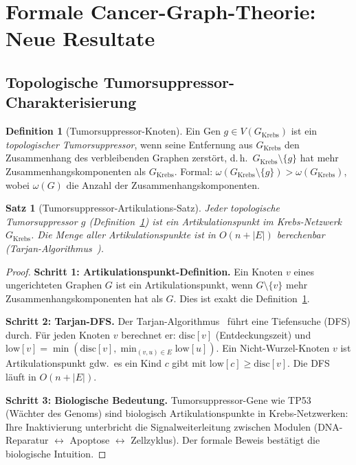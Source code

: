 ﻿\documentclass[a4paper,12pt]{article}
\theoremstyle{plain}
\newtheorem{satz}{Satz}
\theoremstyle{definition}
\newtheorem{definition}{Definition}
\theoremstyle{remark}
\newcommand{\Gkrebs}{G_{\mathrm{Krebs}}}
\begin{document}
\section{Formale Cancer-Graph-Theorie: Neue Resultate}

\subsection{Topologische Tumorsuppressor-Charakterisierung}

\begin{definition}[Tumorsuppressor-Knoten]
\label{def:tumor_supp}
Ein Gen $g \in V(\Gkrebs)$ ist ein \emph{topologischer Tumorsuppressor},
wenn seine Entfernung aus $\Gkrebs$ den Zusammenhang des
verbleibenden Graphen zerst\"ort, d.\,h.\
$\Gkrebs \setminus \{g\}$ hat mehr Zusammenhangskomponenten als $\Gkrebs$.
Formal: $\omega(\Gkrebs \setminus \{g\}) > \omega(\Gkrebs)$,
wobei $\omega(G)$ die Anzahl der Zusammenhangskomponenten.
\end{definition}

\begin{satz}[Tumorsuppressor-Artikulations-Satz]
\label{satz:tumor_artik}
Jeder topologische Tumorsuppressor $g$ (Definition~\ref{def:tumor_supp})
ist ein \emph{Artikulationspunkt} im Krebs-Netzwerk $\Gkrebs$.
Die Menge aller Artikulationspunkte ist in $O(n + |E|)$ berechenbar
(Tarjan-Algorithmus~\cite{tarjan1972}).
\end{satz}

\begin{proof}
\textbf{Schritt 1: Artikulationspunkt-Definition.}
Ein Knoten $v$ eines ungerichteten Graphen $G$ ist ein Artikulationspunkt,
wenn $G \setminus \{v\}$ mehr Zusammenhangskomponenten hat als $G$.
Dies ist exakt die Definition~\ref{def:tumor_supp}.

\textbf{Schritt 2: Tarjan-DFS.}
Der Tarjan-Algorithmus~\cite{tarjan1972} f\"uhrt eine Tiefensuche (DFS) durch.
F\"ur jeden Knoten $v$ berechnet er:
$\mathrm{disc}[v]$ (Entdeckungszeit) und
$\mathrm{low}[v] = \min(\mathrm{disc}[v], \min_{(v,u)\in E}\mathrm{low}[u])$.
Ein Nicht-Wurzel-Knoten $v$ ist Artikulationspunkt gdw.\
es ein Kind $c$ gibt mit $\mathrm{low}[c] \geq \mathrm{disc}[v]$.
Die DFS l\"auft in $O(n + |E|)$.

\textbf{Schritt 3: Biologische Bedeutung.}
Tumorsuppressor-Gene wie TP53 (Wächter des Genoms) sind biologisch
Artikulationspunkte in Krebs-Netzwerken: Ihre Inaktivierung
unterbricht die Signalweiterleitung zwischen Modulen
(DNA-Reparatur $\leftrightarrow$ Apoptose $\leftrightarrow$ Zellzyklus).
Der formale Beweis bestätigt die biologische Intuition.
\end{proof}
\end{document}
